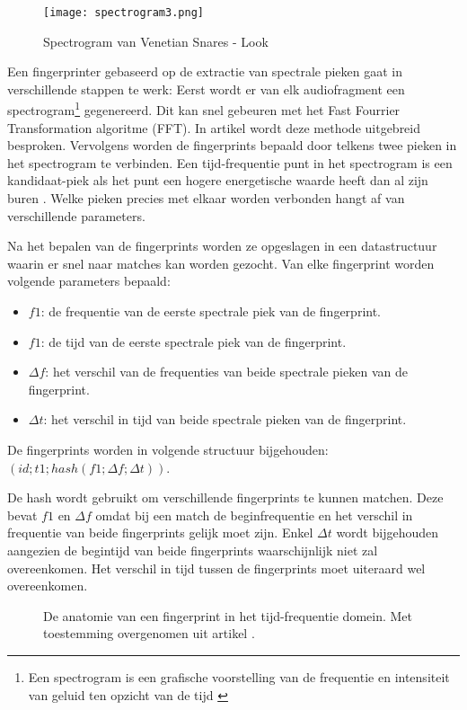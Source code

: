 \begin{figure}[!h]
	\caption[Voorbeeldspectogram]{Spectrogram van Venetian Snares - Look}
	\centering
	\texttt{[image: spectrogram3.png]}
\end{figure}

Een fingerprinter gebaseerd op de extractie van spectrale pieken gaat in verschillende stappen te werk: 
Eerst wordt er van elk audiofragment een spectrogram\footnote{Een spectrogram is een grafische voorstelling van de frequentie en intensiteit van geluid ten opzicht van de tijd \cite{spectrogram_dict}} gegenereerd. Dit kan snel gebeuren met het Fast Fourrier Transformation algoritme (FFT). In artikel \cite{oppenheim1970speech} wordt deze methode uitgebreid besproken. Vervolgens worden de fingerprints bepaald door telkens twee pieken in het spectrogram te verbinden. Een tijd-frequentie punt in het spectrogram is een kandidaat-piek als het punt een hogere energetische waarde heeft dan al zijn buren \cite{Wang2003a}. Welke pieken precies met elkaar worden verbonden hangt af van verschillende parameters.

Na het bepalen van de fingerprints worden ze opgeslagen in een datastructuur waarin er snel naar matches kan worden gezocht.
Van elke fingerprint worden volgende parameters bepaald:
\begin{itemize}[noitemsep]
	\item $ f1 $: de frequentie van de eerste spectrale piek van de fingerprint.
	\item $ f1 $: de tijd van de eerste spectrale piek van de fingerprint.
	\item $ \Delta f $: het verschil van de frequenties van beide spectrale pieken van de fingerprint.
	\item $ \Delta t $: het verschil in tijd van beide spectrale pieken van de fingerprint.
\end{itemize}

De fingerprints worden in volgende structuur bijgehouden: $ ( id; t1; hash(f1; \Delta f; \Delta t) ) $.

De hash wordt gebruikt om verschillende fingerprints te kunnen matchen. Deze bevat $ f1 $ en $ \Delta f $ omdat bij een match de beginfrequentie en het verschil in frequentie van beide fingerprints gelijk moet zijn. Enkel $ \Delta t $ wordt bijgehouden aangezien de begintijd van beide fingerprints waarschijnlijk niet zal overeenkomen. Het verschil in tijd tussen de fingerprints moet uiteraard wel overeenkomen.

\begin{figure}
	\captionsetup{width=0.7\textwidth}
	\caption[De anatomie van een fingerprint]{De anatomie van een fingerprint in het tijd-frequentie domein. Met toestemming overgenomen uit artikel \cite{six2015multimodal}.}
	\begin{center}
		\advance\parskip0.3cm
		
	\end{center}
\end{figure}

